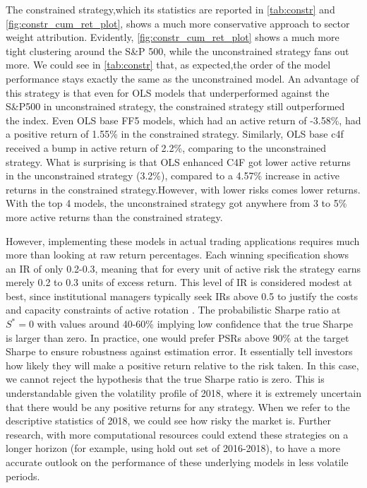 The constrained strategy,which its statistics are reported in \cref{tab:constr} and \cref{fig:constr_cum_ret_plot}, shows a much more conservative approach to sector weight attribution. Evidently, \cref{fig:constr_cum_ret_plot} shows a much more tight clustering around the S\&P 500, while the unconstrained strategy fans out more. We could see in \cref{tab:constr} that, as expected,the order of the model performance stays exactly the same as the unconstrained model. An advantage of this strategy is that even for OLS models that underperformed against the S\&P500 in unconstrained strategy, the constrained strategy still outperformed the index. Even OLS base FF5 models, which had an active return of -3.58\%, had a positive return of 1.55\% in the constrained strategy. Similarly, OLS base c4f received a bump in active return of 2.2\%, comparing to the unconstrained strategy. What is surprising is that OLS enhanced C4F got lower active returns in the unconstrained strategy (3.2\%), compared to a 4.57\% increase in active returns in the constrained strategy.However, with lower risks comes lower returns. With the top 4 models, the unconstrained strategy got anywhere from 3 to 5\% more active returns than the constrained strategy.

However, implementing these models in actual trading applications requires much more than looking at raw return percentages. Each winning specification shows an IR of only 0.2-0.3, meaning that for every unit of active risk the strategy earns merely 0.2 to 0.3 units of excess return. This level of IR is considered modest at best, since institutional managers typically seek IRs above 0.5 to justify the costs and capacity constraints of active rotation \cite{gratton_2025}. The probabilistic Sharpe ratio at $S^{*} = 0$  with values around 40-60\% implying low confidence that the true Sharpe is larger than zero. In practice, one would prefer PSRs above 90\% at the target Sharpe to ensure robustness against estimation error. It essentially tell investors how likely they will make a positive return relative to the risk taken. In this case, we cannot reject the hypothesis that the true Sharpe ratio is zero. This is understandable given the volatility profile of 2018, where it is extremely uncertain that there would be any positive returns for any strategy. When we refer to the descriptive statistics of 2018, we could see how risky the market is.  Further research, with more computational resources could extend these strategies on a longer horizon (for example, using hold out set of 2016-2018), to have a more accurate outlook on the performance of these underlying models in less volatile periods.



